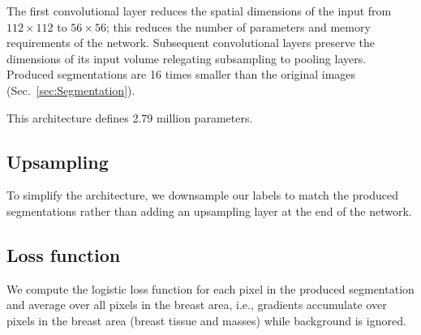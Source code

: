 	The first convolutional layer reduces the spatial dimensions of the input from $112 \times 112$ to $56 \times 56$; this reduces the number of parameters and memory requirements of the network. Subsequent convolutional layers preserve the dimensions of its input volume relegating subsampling to pooling layers. 
Produced segmentations are 16 times smaller than the original images (Sec.~\ref{sec:Segmentation}).

This architecture defines 2.79 million parameters. %


\subsection{Upsampling}
To simplify the architecture, we downsample our labels to match the produced segmentations rather than adding an upsampling layer at the end of the network.

\subsection{Loss function}
We compute the logistic loss function for each pixel in the produced segmentation and average over all pixels in the breast area, i.e., gradients accumulate over pixels in the breast area (breast tissue and masses) while background is ignored.
